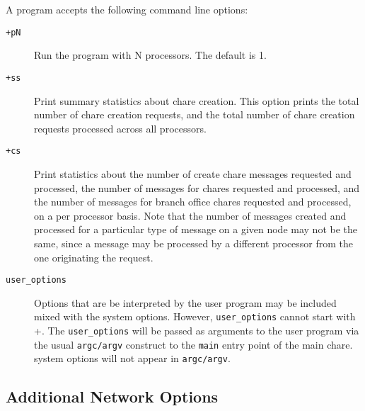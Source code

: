 A \charmpp{} program accepts the following command line options:
\begin{description}

\item[{\tt +pN}] Run the program with N processors. The default is 1.

\item[{\tt +ss}] Print summary statistics about chare creation.  This option
prints the total number of chare creation requests, and the total number of
chare creation requests processed across all processors.

\item[{\tt +cs}] Print statistics about the number of create chare messages
requested and processed, the number of messages for chares requested and
processed, and the number of messages for branch office chares requested and
processed, on a per processor basis.  Note that the number of messages
created and processed for a particular type of message on a given node
may not be the same, since a message may be processed by a different
processor from the one originating the request.

\item[{\tt user\_options}] Options that are be interpreted by the user
program may be included mixed with the system options.
However, {\tt user\_options} cannot start with +.
The {\tt user\_options} will be passed as arguments to the user program
via the usual {\tt argc/argv} construct to the {\tt main}
entry point of the main chare.
\charmpp{} system options will not appear in {\tt argc/argv}.

\end{description}



\subsection{Additional Network Options}
\label{network command line options}


